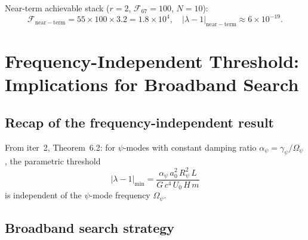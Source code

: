 \documentclass[11pt]{article}
\theoremstyle{definition}
\theoremstyle{remark}
\newcommand{\lam}{\lambda}
\newcommand{\Opsi}{\Omega_\psi}
\newcommand{\gpsi}{\gamma_\psi}
\begin{document}
Near-term achievable stack ($r=2$, $\mathcal{F}_{67}=100$, $N=10$):
\begin{equation}
\mathcal{F}_{\mathrm{near-term}} = 55\times100\times3.2 = 1.8\times10^4,
\quad|\lam-1|_{\mathrm{near-term}} \approx 6\times10^{-19}.
\end{equation}


\section{Frequency-Independent Threshold: Implications for Broadband Search}
\label{sec:broadband}

\subsection{Recap of the frequency-independent result}

From iter~2, Theorem~6.2: for $\psi$-modes with constant damping ratio
$\alpha_\psi = \gpsi/\Opsi$, the parametric threshold
\begin{equation}
|\lam-1|_{\mathrm{min}} = \frac{\alpha_\psi\,a_0^2\,R_\psi^2\,L}{G\,c^4\,U_0\,H\,m}
\end{equation}
is independent of the $\psi$-mode frequency $\Opsi$.

\subsection{Broadband search strategy}
\end{document}
